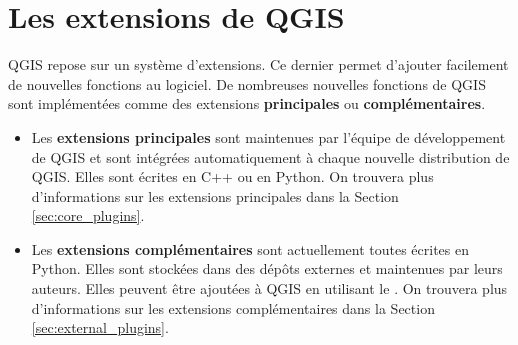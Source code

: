 
\section{Les extensions de QGIS}\label{sec:extensions}



QGIS repose sur un système d'extensions.
Ce dernier permet d'ajouter facilement de nouvelles fonctions au logiciel. 
De nombreuses nouvelles fonctions de QGIS sont implémentées comme des extensions \textbf{principales} ou \textbf{complémentaires}.  

\begin{itemize}
\item Les \textbf{extensions principales} sont maintenues par l'équipe de développement de QGIS et sont intégrées automatiquement à chaque nouvelle distribution de QGIS.
Elles sont écrites en C++ ou en Python.
On trouvera plus d'informations sur les extensions principales dans la Section \ref{sec:core_plugins}.
\item Les \textbf{extensions complémentaires} sont actuellement toutes écrites en Python.
Elles sont stockées dans des dépôts externes et maintenues par leurs auteurs.
Elles peuvent être ajoutées à QGIS en utilisant le .
On trouvera plus d'informations sur les extensions complémentaires dans la Section \ref{sec:external_plugins}.
\end{itemize}

